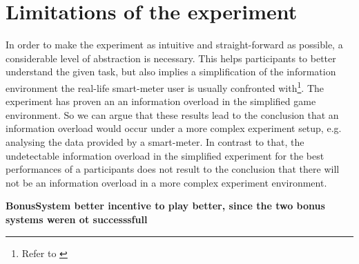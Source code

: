 \section{Limitations of the experiment}
In order to make the experiment as intuitive and straight-forward as possible, a considerable level of abstraction is necessary. This helps participants to better understand the given task, but also implies a simplification of the information environment the real-life smart-meter user is usually confronted with\footnote{Refer to \cite{Jacoby1984}}. The experiment has proven an
an information overload in the simplified game environment. So we can argue that these results lead to the conclusion that an information overload would occur under a more complex experiment setup, e.g. analysing the data provided by a smart-meter. 
In contrast to that, the undetectable information overload in the simplified experiment for the best performances of a participants does not result to the conclusion that there will not be an information overload in a more complex experiment environment.



\textbf{BonusSystem better incentive to play better, since the two bonus systems weren ot successsfull}
%
%
%
%

